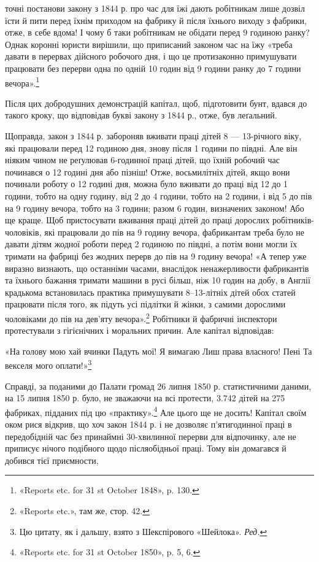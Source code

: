 \parcont{}  %
точні постанови закону з 1844 р. про час для їжі дають робітникам
лише дозвіл їсти й пити перед їхнім приходом на фабрику
й після їхнього виходу з фабрики, отже, в себе вдома! І чому б
таки робітникам не обідати перед 9 годиною ранку? Однак коронні
юристи вирішили, що приписаний законом час на їжу «треба
давати в перервах дійсного робочого дня, і що це протизаконно
примушувати працювати без перерви одна по одній 10 годин
від 9 години ранку до 7 години вечора».\footnote{
«Reports etc. for 31 st October 1848», p. 130.
}

Після цих добродушних демонстрацій капітал, щоб, підготовити
бунт, вдався до такого кроку, що відповідав букві закону
з 1844 р., отже, був леґальний.

Щоправда, закон з 1844 р. забороняв вживати праці дітей 8 —
13-річного віку, які працювали перед 12 годиною дня, знову після
1 години по півдні. Але він ніяким чином не реґулював 6-годинної
праці дітей, що їхній робочий час починався о 12 годині
дня або пізніш! Отже, восьмилітніх дітей, якщо вони починали
роботу о 12 годині дня, можна було вживати до праці від 12 до
1 години, тобто на одну годину, від 2 до 4 години, тобто на 2 години,
і від 5 до пів на 9 годину вечора, тобто на 3 години; разом
6 годин, визначених законом! Або ще краще. Щоб пристосувати
вживання праці дітей до праці дорослих робітників-чоловіків, які
працювали до пів на 9 годину вечора, фабрикантам треба було не
давати дітям жодної роботи перед 2 годиною по півдні, а потім вони
могли їх тримати на фабриці без жодних перерв до пів на 9 годину
вечора! «А тепер уже виразно визнають, що останніми часами,
внаслідок ненажерливости фабрикантів та їхнього бажання тримати
машини в русі більш, ніж 10 годин на добу, в Англії крадькома
встановилась практика примушувати 8--13-літніх дітей
обох статей працювати після того, як підуть усі підлітки й жінки,
з самими дорослими чоловіками до пів на дев’яту вечора».\footnote{
«Reports etc.», там же, стор. 42.
}
Робітники й фабричні інспектори протестували з гігієнічних і
моральних причин. Але капітал відповідав:

«На голову мою хай вчинки
Падуть мої! Я вимагаю
Лиш права власного! Пені
Та векселя мого оплати!»\footnote*{
Цю цитату, як і дальшу, взято з Шекспірового «Шейлока». \emph{Ред.}
}

Справді, за поданими до Палати громад 26 липня 1850 р.
статистичними даними, на 15 липня 1850 р. було, не зважаючи
на всі протести, 3.742 дітей на 275 фабриках, підданих під цю
«практику».\footnote{
«Reports etc. for 31 st October 1850», p. 5, 6.
} Але цього ще не досить! Капітал своїм оком
рися відкрив, що хоч закон 1844 р. і не дозволяє п’ятигодинної
праці в передобідній час без принаймні 30-хвилинної перерви
для відпочинку, але не приписує нічого подібного щодо післяобідньої
праці. Тому він домагався й добився тієї приємности,
\parbreak{}  %
